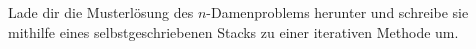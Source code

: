 \begin{aufg} Lade dir die Musterlösung des $n$-Damenproblems herunter und schreibe sie mithilfe eines selbstgeschriebenen Stacks zu einer iterativen Methode um. \end{aufg}